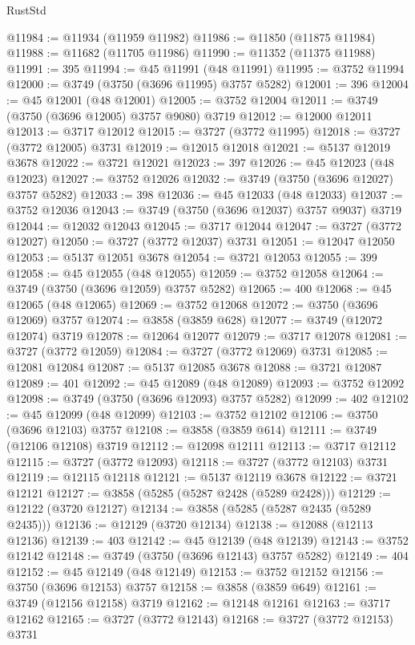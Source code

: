\begin{lexlean}{RustStd}
\begin{coremodule}
@11984 := @11934 (@11959 @11982)
@11986 := @11850 (@11875 @11984)
@11988 := @11682 (@11705 @11986)
@11990 := @11352 (@11375 @11988)
@11991 := 395
@11994 := @45 @11991 (@48 @11991)
@11995 := @3752 @11994
@12000 := @3749 (@3750 (@3696 @11995) @3757 @5282)
@12001 := 396
@12004 := @45 @12001 (@48 @12001)
@12005 := @3752 @12004
@12011 := @3749 (@3750 (@3696 @12005) @3757 @9080) @3719
@12012 := @12000 @12011
@12013 := @3717 @12012
@12015 := @3727 (@3772 @11995)
@12018 := @3727 (@3772 @12005) @3731
@12019 := @12015 @12018
@12021 := @5137 @12019 @3678
@12022 := @3721 @12021
@12023 := 397
@12026 := @45 @12023 (@48 @12023)
@12027 := @3752 @12026
@12032 := @3749 (@3750 (@3696 @12027) @3757 @5282)
@12033 := 398
@12036 := @45 @12033 (@48 @12033)
@12037 := @3752 @12036
@12043 := @3749 (@3750 (@3696 @12037) @3757 @9037) @3719
@12044 := @12032 @12043
@12045 := @3717 @12044
@12047 := @3727 (@3772 @12027)
@12050 := @3727 (@3772 @12037) @3731
@12051 := @12047 @12050
@12053 := @5137 @12051 @3678
@12054 := @3721 @12053
@12055 := 399
@12058 := @45 @12055 (@48 @12055)
@12059 := @3752 @12058
@12064 := @3749 (@3750 (@3696 @12059) @3757 @5282)
@12065 := 400
@12068 := @45 @12065 (@48 @12065)
@12069 := @3752 @12068
@12072 := @3750 (@3696 @12069) @3757
@12074 := @3858 (@3859 @628)
@12077 := @3749 (@12072 @12074) @3719
@12078 := @12064 @12077
@12079 := @3717 @12078
@12081 := @3727 (@3772 @12059)
@12084 := @3727 (@3772 @12069) @3731
@12085 := @12081 @12084
@12087 := @5137 @12085 @3678
@12088 := @3721 @12087
@12089 := 401
@12092 := @45 @12089 (@48 @12089)
@12093 := @3752 @12092
@12098 := @3749 (@3750 (@3696 @12093) @3757 @5282)
@12099 := 402
@12102 := @45 @12099 (@48 @12099)
@12103 := @3752 @12102
@12106 := @3750 (@3696 @12103) @3757
@12108 := @3858 (@3859 @614)
@12111 := @3749 (@12106 @12108) @3719
@12112 := @12098 @12111
@12113 := @3717 @12112
@12115 := @3727 (@3772 @12093)
@12118 := @3727 (@3772 @12103) @3731
@12119 := @12115 @12118
@12121 := @5137 @12119 @3678
@12122 := @3721 @12121
@12127 := @3858 (@5285 (@5287 @2428 (@5289 @2428)))
@12129 := @12122 (@3720 @12127)
@12134 := @3858 (@5285 (@5287 @2435 (@5289 @2435)))
@12136 := @12129 (@3720 @12134)
@12138 := @12088 (@12113 @12136)
@12139 := 403
@12142 := @45 @12139 (@48 @12139)
@12143 := @3752 @12142
@12148 := @3749 (@3750 (@3696 @12143) @3757 @5282)
@12149 := 404
@12152 := @45 @12149 (@48 @12149)
@12153 := @3752 @12152
@12156 := @3750 (@3696 @12153) @3757
@12158 := @3858 (@3859 @649)
@12161 := @3749 (@12156 @12158) @3719
@12162 := @12148 @12161
@12163 := @3717 @12162
@12165 := @3727 (@3772 @12143)
@12168 := @3727 (@3772 @12153) @3731

\end{coremodule}
\end{lexlean}
